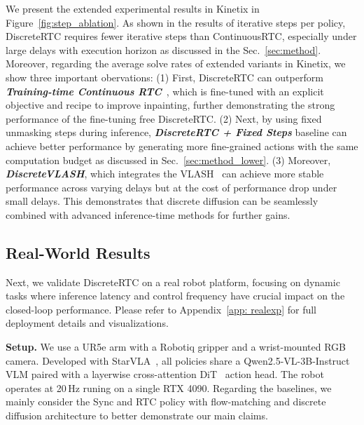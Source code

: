 \documentclass{article}
\begin{document}
We present the extended experimental results in Kinetix in Figure~\ref{fig:step_ablation}.
As shown in the results of iterative steps per policy, DiscreteRTC requires fewer iterative steps than ContinuousRTC, especially under large delays with execution horizon as discussed in the Sec.~\ref{sec:method}.
Moreover, regarding the average solve rates of extended variants in Kinetix, we show three important obervations:
(1) First, DiscreteRTC can outperform \textit{\textbf{Training-time Continuous RTC}}~\citep{black2025training}, which is fine-tuned with an explicit objective and recipe to improve inpainting, further demonstrating the strong performance of the fine-tuning free DiscreteRTC.
(2) Next, by using fixed unmasking steps during inference, \textit{\textbf{DiscreteRTC + Fixed Steps}} baseline can achieve better performance by generating more fine-grained actions with the same computation budget as discussed in Sec.~\ref{sec:method_lower}.
(3) Moreover, \textit{\textbf{DiscreteVLASH}}, which integrates the VLASH~\citep{tang2025vlash} can achieve more stable performance across varying delays but at the cost of performance drop under small delays.
This demonstrates that discrete diffusion can be seamlessly combined with advanced inference-time methods for further gains.


\subsection{Real-World Results}
\label{sec:exp_real}
Next, we validate DiscreteRTC on a real robot platform, focusing on dynamic tasks where inference latency and control frequency have crucial impact on the closed-loop performance. Please refer to Appendix~\ref{app: realexp} for full deployment details and visualizations.

\textbf{Setup.}
We use a UR5e arm with a Robotiq gripper and a wrist-mounted RGB camera.
Developed with StarVLA~\citep{community2026starvla}, all policies share a Qwen2.5-VL-3B-Instruct~\citep{yang2025qwen3} VLM paired with a layerwise cross-attention DiT~\citep{peebles2023scalable} action head.
The robot operates at 20\,Hz runing on a single RTX 4090.
Regarding the baselines, we mainly consider the Sync and RTC policy with flow-matching and discrete diffusion architecture to better demonstrate our main claims.
\end{document}
